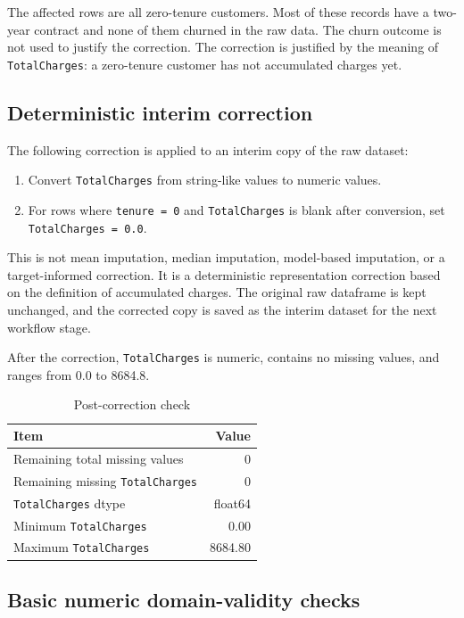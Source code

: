 The affected rows are all zero-tenure customers. Most of these records have a two-year contract and none of them churned in the raw data. The churn outcome is not used to justify the correction. The correction is justified by the meaning of \texttt{TotalCharges}: a zero-tenure customer has not accumulated charges yet.

\subsection{Deterministic interim correction}

The following correction is applied to an interim copy of the raw dataset:

\begin{enumerate}[leftmargin=*]
    \item Convert \texttt{TotalCharges} from string-like values to numeric values.
    \item For rows where \texttt{tenure = 0} and \texttt{TotalCharges} is blank after conversion, set \texttt{TotalCharges = 0.0}.
\end{enumerate}

This is not mean imputation, median imputation, model-based imputation, or a target-informed correction. It is a deterministic representation correction based on the definition of accumulated charges. The original raw dataframe is kept unchanged, and the corrected copy is saved as the interim dataset for the next workflow stage.

After the correction, \texttt{TotalCharges} is numeric, contains no missing values, and ranges from 0.0 to 8684.8.

\begin{table}[H]
\centering
\caption{Post-correction check}
\label{tab:post-correction}
\begin{tabular}{lr}
\toprule
Item & Value \\
\midrule
Remaining total missing values & 0 \\
Remaining missing \texttt{TotalCharges} & 0 \\
\texttt{TotalCharges} dtype & float64 \\
Minimum \texttt{TotalCharges} & 0.00 \\
Maximum \texttt{TotalCharges} & 8684.80 \\
\bottomrule
\end{tabular}
\end{table}

\subsection{Basic numeric domain-validity checks}

